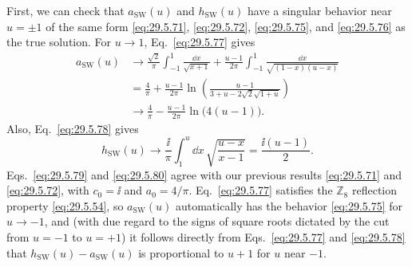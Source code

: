 First, we can check that \(a_{\mathrm{SW}}(u)\) and \(h_{\mathrm{SW}}(u)\)
have a singular behavior near \(u=\pm1\) of the same form
\eqref{eq:29.5.71}, \eqref{eq:29.5.72}, \eqref{eq:29.5.75}, and
\eqref{eq:29.5.76} as the true solution. For \(u\longrightarrow1\),
Eq.~\eqref{eq:29.5.77} gives
\begin{equation}
  \begin{aligned}
  a_{\mathrm{SW}}(u)
  &\longrightarrow
  \frac{\sqrt{2}}{\pi}\int_{-1}^{1}\frac{\dd x}{\sqrt{x+1}}
  +\frac{u-1}{2\pi}\int_{-1}^{1}
    \frac{\dd x}{\sqrt{(1-x)(u-x)}}
  \\
  &=\frac{4}{\pi}
  +\frac{u-1}{2\pi}\ln\left(
    \frac{u-1}{3+u-2\sqrt{2}\sqrt{1+u}}
  \right)
  \\
  &\longrightarrow
  \frac{4}{\pi}-\frac{u-1}{2\pi}\ln\bigl(4(u-1)\bigr).
  \end{aligned}
  \tag{29.5.79}\label{eq:29.5.79}
\end{equation}
Also, Eq.~\eqref{eq:29.5.78} gives
\begin{equation}
  h_{\mathrm{SW}}(u)
  \longrightarrow\frac{\ii}{\pi}\int_1^u \dd x\,
  \sqrt{\frac{u-x}{x-1}}
  =\frac{\ii(u-1)}{2}.
  \tag{29.5.80}\label{eq:29.5.80}
\end{equation}
Eqs.~\eqref{eq:29.5.79} and \eqref{eq:29.5.80} agree with our previous
results \eqref{eq:29.5.71} and \eqref{eq:29.5.72}, with \(c_0=\ii\) and
\(a_0=4/\pi\). Eq.~\eqref{eq:29.5.77} satisfies the
\(\mathbb{Z}_8\) reflection property \eqref{eq:29.5.54}, so
\(a_{\mathrm{SW}}(u)\) automatically has the behavior \eqref{eq:29.5.75}
for \(u\longrightarrow-1\), and (with due regard to the signs of square
roots dictated by the cut from \(u=-1\) to \(u=+1\)) it follows directly
from Eqs.~\eqref{eq:29.5.77} and \eqref{eq:29.5.78} that
\(h_{\mathrm{SW}}(u)-a_{\mathrm{SW}}(u)\) is proportional to \(u+1\) for
\(u\) near \(-1\).

